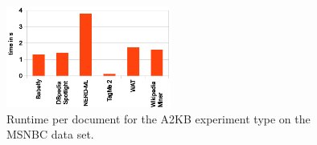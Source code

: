 \begin{figure}[ht]
\centering
\includegraphics[width=0.48\textwidth]{part_02/benchmarking/ESWC_GERBIL_demo/needed_times.eps}
\caption{Runtime per document for the A2KB experiment type on the MSNBC data set.}
\label{cha333:fig:runtime}
\end{figure}

